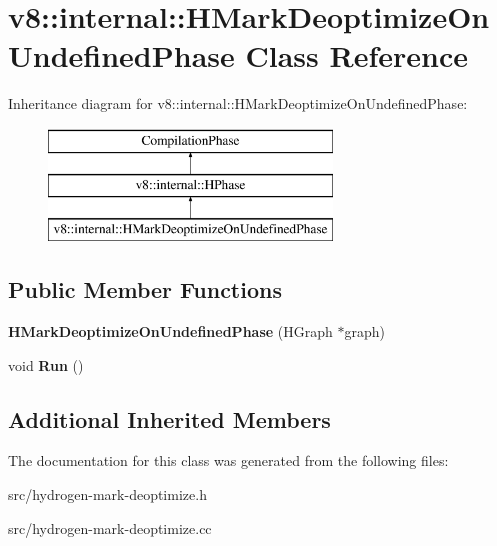 \hypertarget{classv8_1_1internal_1_1_h_mark_deoptimize_on_undefined_phase}{}\section{v8\+:\+:internal\+:\+:H\+Mark\+Deoptimize\+On\+Undefined\+Phase Class Reference}
\label{classv8_1_1internal_1_1_h_mark_deoptimize_on_undefined_phase}
Inheritance diagram for v8\+:\+:internal\+:\+:H\+Mark\+Deoptimize\+On\+Undefined\+Phase\+:\begin{figure}[H]
\begin{center}
\leavevmode
\includegraphics[height=3.000000cm]{classv8_1_1internal_1_1_h_mark_deoptimize_on_undefined_phase}
\end{center}
\end{figure}
\subsection*{Public Member Functions}
\begin{DoxyCompactItemize}
\item 
\hypertarget{classv8_1_1internal_1_1_h_mark_deoptimize_on_undefined_phase_a263830b1533263b51a21c97ac76d9e53}{}{\bfseries H\+Mark\+Deoptimize\+On\+Undefined\+Phase} (H\+Graph $\ast$graph)\label{classv8_1_1internal_1_1_h_mark_deoptimize_on_undefined_phase_a263830b1533263b51a21c97ac76d9e53}

\item 
\hypertarget{classv8_1_1internal_1_1_h_mark_deoptimize_on_undefined_phase_a236682051cc067b39a8bb7642a80bc11}{}void {\bfseries Run} ()\label{classv8_1_1internal_1_1_h_mark_deoptimize_on_undefined_phase_a236682051cc067b39a8bb7642a80bc11}

\end{DoxyCompactItemize}
\subsection*{Additional Inherited Members}


The documentation for this class was generated from the following files\+:\begin{DoxyCompactItemize}
\item 
src/hydrogen-\/mark-\/deoptimize.\+h\item 
src/hydrogen-\/mark-\/deoptimize.\+cc\end{DoxyCompactItemize}
